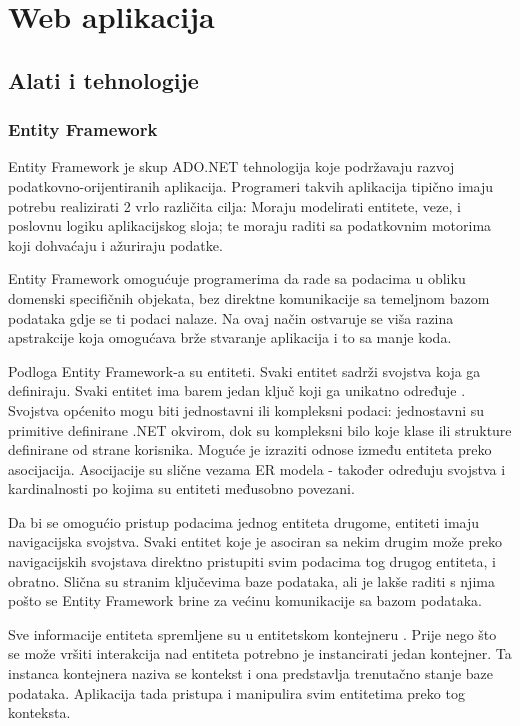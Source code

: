 \documentclass[times, utf8, zavrsni]{fer}
\begin{document}
\lstset{style=sql, numbers=left}


\chapter{Web aplikacija}
\section{Alati i tehnologije}

\subsection{Entity Framework}

Entity Framework je skup ADO.NET tehnologija koje podržavaju razvoj podatkovno-orijentiranih aplikacija. Programeri takvih aplikacija tipično imaju potrebu realizirati 2 vrlo različita cilja: Moraju modelirati entitete, veze, i poslovnu logiku aplikacijskog sloja; te moraju raditi sa podatkovnim motorima  koji dohvaćaju i ažuriraju podatke.

Entity Framework omogućuje programerima da rade sa podacima u obliku domenski specifičnih objekata, bez direktne komunikacije sa temeljnom bazom podataka gdje se ti podaci nalaze. Na ovaj način ostvaruje se viša razina apstrakcije koja omogućava brže stvaranje aplikacija i to sa manje koda.

Podloga Entity Framework-a su entiteti. Svaki entitet sadrži svojstva  koja ga definiraju. Svaki entitet ima barem jedan ključ koji ga unikatno određuje . Svojstva općenito mogu biti jednostavni ili kompleksni podaci: jednostavni su primitive definirane .NET okvirom, dok su kompleksni bilo koje klase ili strukture definirane od strane korisnika. 
Moguće je izraziti odnose između entiteta preko asocijacija. Asocijacije su slične vezama ER modela - također određuju svojstva i kardinalnosti po kojima su entiteti međusobno povezani.

Da bi se omogućio pristup podacima jednog entiteta drugome, entiteti imaju navigacijska svojstva. Svaki entitet koje je asociran sa nekim drugim može preko navigacijskih svojstava direktno pristupiti svim podacima tog drugog entiteta, i obratno. Slična su stranim ključevima baze podataka, ali je lakše raditi s njima pošto se Entity Framework brine za većinu komunikacije sa bazom podataka.\clearpage

Sve informacije entiteta spremljene su u entitetskom kontejneru . Prije nego što se može vršiti interakcija nad entiteta potrebno je instancirati jedan kontejner. Ta instanca kontejnera naziva se kontekst  i ona predstavlja trenutačno stanje baze podataka. Aplikacija tada pristupa i manipulira svim entitetima preko tog konteksta.
\end{document}
